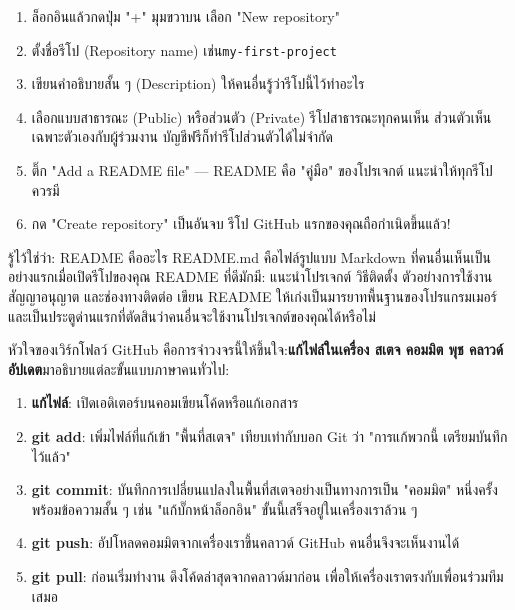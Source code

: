 \begin{enumerate}
  \item ล็อกอินแล้วกดปุ่ม "+" มุมขวาบน เลือก "New repository"
  \item ตั้งชื่อรีโป (Repository name) เช่น\texttt{my-\allowbreak first-\allowbreak project}
  \item เขียนคำอธิบายสั้น ๆ (Description) ให้คนอื่นรู้ว่ารีโปนี้ไว้ทำอะไร
  \item เลือกแบบสาธารณะ (Public) หรือส่วนตัว (Private) รีโปสาธารณะทุกคนเห็น ส่วนตัวเห็นเฉพาะตัวเองกับผู้ร่วมงาน บัญชีฟรีก็ทำรีโปส่วนตัวได้ไม่จำกัด
  \item ติ๊ก "Add a README file" — README คือ "คู่มือ" ของโปรเจกต์ แนะนำให้ทุกรีโปควรมี
  \item กด "Create repository" เป็นอันจบ รีโป GitHub แรกของคุณถือกำเนิดขึ้นแล้ว!
\end{enumerate}

\begin{tcbinfo}{รู้ไว้ใช่ว่า: README คืออะไร}
README.md คือไฟล์รูปแบบ Markdown ที่คนอื่นเห็นเป็นอย่างแรกเมื่อเปิดรีโปของคุณ README ที่ดีมักมี: แนะนำโปรเจกต์ วิธีติดตั้ง ตัวอย่างการใช้งาน สัญญาอนุญาต และช่องทางติดต่อ เขียน README ให้เก่งเป็นมารยาทพื้นฐานของโปรแกรมเมอร์ และเป็นประตูด่านแรกที่ตัดสินว่าคนอื่นจะใช้งานโปรเจกต์ของคุณได้หรือไม่

\end{tcbinfo}


หัวใจของเวิร์กโฟลว์ GitHub คือการจำวงจรนี้ให้ขึ้นใจ:\textbf{แก้ไฟล์ในเครื่อง สเตจ คอมมิต พุช คลาวด์อัปเดต}มาอธิบายแต่ละขั้นแบบภาษาคนทั่วไป:

\begin{enumerate}
  \item \textbf{แก้ไฟล์}: เปิดเอดิเตอร์บนคอมเขียนโค้ดหรือแก้เอกสาร
  \item \textbf{git add}: เพิ่มไฟล์ที่แก้เข้า "พื้นที่สเตจ" เทียบเท่ากับบอก Git ว่า "การแก้พวกนี้ เตรียมบันทึกไว้แล้ว"
  \item \textbf{git commit}: บันทึกการเปลี่ยนแปลงในพื้นที่สเตจอย่างเป็นทางการเป็น "คอมมิต" หนึ่งครั้ง พร้อมข้อความสั้น ๆ เช่น "แก้บั๊กหน้าล็อกอิน" ขั้นนี้เสร็จอยู่ในเครื่องเราล้วน ๆ
  \item \textbf{git push}: อัปโหลดคอมมิตจากเครื่องเราขึ้นคลาวด์ GitHub คนอื่นจึงจะเห็นงานได้
  \item \textbf{git pull}: ก่อนเริ่มทำงาน ดึงโค้ดล่าสุดจากคลาวด์มาก่อน เพื่อให้เครื่องเราตรงกับเพื่อนร่วมทีมเสมอ
\end{enumerate}

